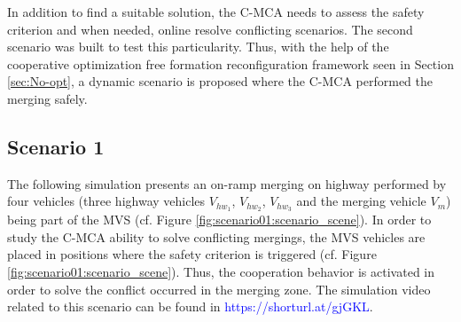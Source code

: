 In addition to find a suitable solution, the C-MCA needs to assess the safety criterion and when needed, online resolve conflicting scenarios. The second scenario was built to test this particularity. Thus, with the help of the cooperative optimization free formation reconfiguration framework seen in Section \ref{sec:No-opt}, a dynamic scenario is proposed where the C-MCA performed the merging safely. 

\subsection*{Scenario 1}
The following simulation presents an on-ramp merging on highway performed by four vehicles (three highway vehicles $V_{hw_1}$, $V_{hw_2}$, $V_{hw_3}$ and the merging vehicle $V_{m}$) being part of the MVS (cf. Figure \ref{fig:scenario01:scenario_scene}). In order to study the C-MCA ability to solve conflicting mergings, the MVS vehicles are placed in positions where the safety criterion is triggered (cf. Figure \ref{fig:scenario01:scenario_scene}). Thus, the cooperation behavior is activated in order to solve the conflict occurred in the merging zone. The simulation video related to this scenario can be found in \textcolor{blue}{https://shorturl.at/gjGKL}. 







